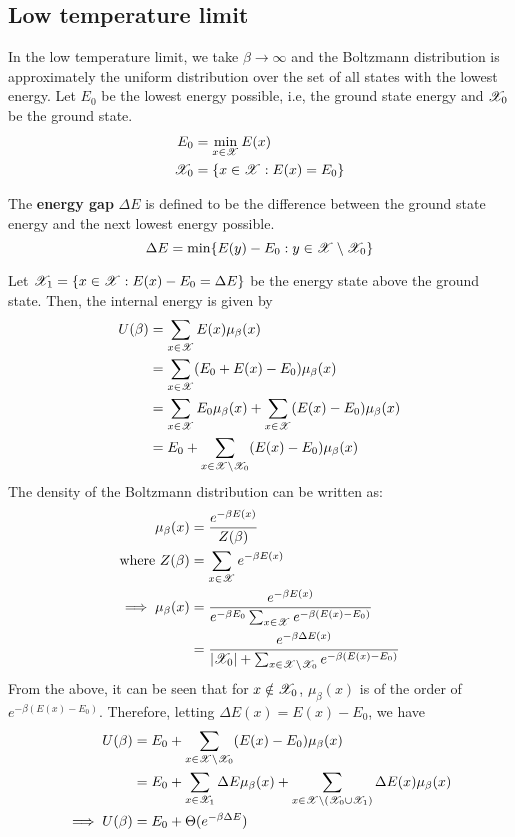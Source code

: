 \documentclass[letterpaper,english,12pt]{article}
\begin{document}
\subsection{Low temperature limit}
In the low temperature limit, we take $\beta \rightarrow \infty$ and the Boltzmann distribution is approximately the uniform distribution over the set of all states with the lowest energy. Let $E_0$ be the lowest energy possible, i.e, the ground state energy and $\mathscr{X}_0$ be the ground state.
\begin{align}
E_0 &= \min_{x \in \mathscr{X}} E(x) \\
\mathscr{X}_0 &= \{ x \in \mathscr{X} : E(x) = E_0 \}
\end{align}
\begin{defn}
The \textbf{energy gap} $\Delta E$ is defined to be the difference between the ground state energy and the next lowest energy possible.
\begin{equation}
\Delta E = \min \{ E(y) - E_0 : y \in \mathscr{X} \setminus \mathscr{X}_0 \}
\end{equation}
\end{defn}
Let $\mathscr{X}_1 = \{ x \in \mathscr{X} : E(x) - E_0 = \Delta E \}$ be the energy state above the ground state. Then, the internal energy is given by
\begin{align}
U(\beta) &= \sum_{x \in \mathscr{X}} E(x) \mu_\beta (x) \nonumber \\
	&= \sum_{x \in \mathscr{X}} (E_0 + E(x) - E_0) \mu_\beta (x) \nonumber \\
	&= \sum_{x \in \mathscr{X}} E_0 \mu_\beta (x) + \sum_{x \in \mathscr{X}} (E(x) - E_0) \mu_\beta (x) \nonumber \\
	&= E_0 + \sum_{x \in \mathscr{X} \setminus \mathscr{X}_0} (E(x) - E_0) \mu_\beta (x)
\end{align}
The density of the Boltzmann distribution can be written as:
\begin{align}
\mu_\beta(x) &= \frac{e^{-\beta E(x)}}{Z(\beta)} \nonumber \\
\text{where } Z(\beta) &= \sum_{x \in \mathscr{X}} e^{-\beta E(x)} \nonumber \\
\implies \mu_\beta (x) &= \frac{e^{-\beta E(x)}}{e^{-\beta E_0}\sum_{x \in \mathscr{X}} e^{-\beta (E(x)-E_0)}} \nonumber \\
	&= \frac{e^{-\beta \Delta E(x)}}{|\mathscr{X}_0| + \sum_{x \in \mathscr{X} \setminus \mathscr{X}_0} e^{-\beta (E(x)-E_0)}} \nonumber
\end{align}
From the above, it can be seen that for $x \notin \mathscr{X}_0$, $\mu_\beta(x)$ is of the order of $e^{-\beta(E(x) - E_0)}$. Therefore, letting $\Delta E(x) = E(x) - E_0$, we have
\begin{align}
U(\beta) &= E_0 + \sum_{x \in \mathscr{X} \setminus \mathscr{X}_0} (E(x) - E_0) \mu_\beta (x) \nonumber \\
	&= E_0 + \sum_{x \in \mathscr{X}_1} \Delta E \mu_\beta (x) + \sum_{x \in \mathscr{X} \setminus (\mathscr{X}_0 \cup \mathscr{X}_1)} \Delta E(x) \mu_\beta (x) \nonumber \\
\implies U(\beta) &= E_0 + \Theta(e^{-\beta \Delta E})
\end{align}
\end{document}
